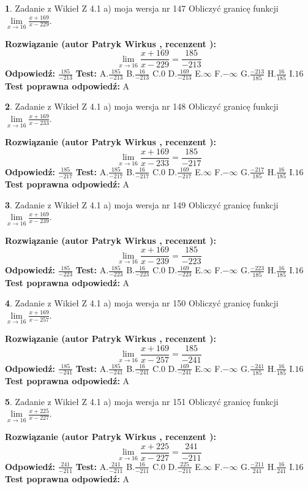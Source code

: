 \documentclass[12pt, a4paper]{article}
\theoremstyle{definition} %
\newtheorem{zad}{}
\newcommand{\zadStart}[1]{\begin{zad}#1\newline}
\newcommand{\zadStop}{\end{zad}}
\newcommand{\rozwStart}[2]{\noindent \textbf{Rozwiązanie (autor #1 , recenzent #2): }\newline}
\newcommand{\rozwStop}{\newline}
\newcommand{\odpStart}{\noindent \textbf{Odpowiedź:}\newline}
\newcommand{\odpStop}{\newline}
\newcommand{\testStart}{\noindent \textbf{Test:}\newline}
\newcommand{\testStop}{\newline}
\newcommand{\kluczStart}{\noindent \textbf{Test poprawna odpowiedź:}\newline}
\newcommand{\kluczStop}{\newline}
\begin{document}
\zadStart{Zadanie z Wikieł Z 4.1 a) moja wersja nr 147}
Obliczyć granicę funkcji $\lim\limits_{x\to16}\frac{x+169}{x-229}$.
\zadStop
\rozwStart{Patryk Wirkus}{}
$$\lim\limits_{x\to16}\frac{x+169}{x-229} = \frac{185}{-213}$$
\rozwStop
\odpStart
$\frac{185}{-213}$
\odpStop
\testStart
A.$\frac{185}{-213}$
B.$\frac{16}{-213}$
C.$0$
D.$\frac{169}{-213}$
E.$\infty$
F.$-\infty$
G.$\frac{-213}{185}$
H.$\frac{16}{185}$
I.$16$
\testStop
\kluczStart
A
\kluczStop



\zadStart{Zadanie z Wikieł Z 4.1 a) moja wersja nr 148}
Obliczyć granicę funkcji $\lim\limits_{x\to16}\frac{x+169}{x-233}$.
\zadStop
\rozwStart{Patryk Wirkus}{}
$$\lim\limits_{x\to16}\frac{x+169}{x-233} = \frac{185}{-217}$$
\rozwStop
\odpStart
$\frac{185}{-217}$
\odpStop
\testStart
A.$\frac{185}{-217}$
B.$\frac{16}{-217}$
C.$0$
D.$\frac{169}{-217}$
E.$\infty$
F.$-\infty$
G.$\frac{-217}{185}$
H.$\frac{16}{185}$
I.$16$
\testStop
\kluczStart
A
\kluczStop



\zadStart{Zadanie z Wikieł Z 4.1 a) moja wersja nr 149}
Obliczyć granicę funkcji $\lim\limits_{x\to16}\frac{x+169}{x-239}$.
\zadStop
\rozwStart{Patryk Wirkus}{}
$$\lim\limits_{x\to16}\frac{x+169}{x-239} = \frac{185}{-223}$$
\rozwStop
\odpStart
$\frac{185}{-223}$
\odpStop
\testStart
A.$\frac{185}{-223}$
B.$\frac{16}{-223}$
C.$0$
D.$\frac{169}{-223}$
E.$\infty$
F.$-\infty$
G.$\frac{-223}{185}$
H.$\frac{16}{185}$
I.$16$
\testStop
\kluczStart
A
\kluczStop



\zadStart{Zadanie z Wikieł Z 4.1 a) moja wersja nr 150}
Obliczyć granicę funkcji $\lim\limits_{x\to16}\frac{x+169}{x-257}$.
\zadStop
\rozwStart{Patryk Wirkus}{}
$$\lim\limits_{x\to16}\frac{x+169}{x-257} = \frac{185}{-241}$$
\rozwStop
\odpStart
$\frac{185}{-241}$
\odpStop
\testStart
A.$\frac{185}{-241}$
B.$\frac{16}{-241}$
C.$0$
D.$\frac{169}{-241}$
E.$\infty$
F.$-\infty$
G.$\frac{-241}{185}$
H.$\frac{16}{185}$
I.$16$
\testStop
\kluczStart
A
\kluczStop



\zadStart{Zadanie z Wikieł Z 4.1 a) moja wersja nr 151}
Obliczyć granicę funkcji $\lim\limits_{x\to16}\frac{x+225}{x-227}$.
\zadStop
\rozwStart{Patryk Wirkus}{}
$$\lim\limits_{x\to16}\frac{x+225}{x-227} = \frac{241}{-211}$$
\rozwStop
\odpStart
$\frac{241}{-211}$
\odpStop
\testStart
A.$\frac{241}{-211}$
B.$\frac{16}{-211}$
C.$0$
D.$\frac{225}{-211}$
E.$\infty$
F.$-\infty$
G.$\frac{-211}{241}$
H.$\frac{16}{241}$
I.$16$
\testStop
\kluczStart
A
\kluczStop
\end{document}
